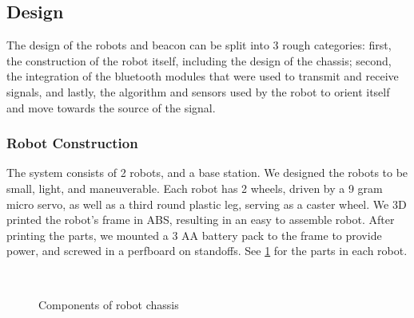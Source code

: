 \documentclass[]{article}
\begin{document}
\subsection{Design}

The design of the robots and beacon can be split into 3 rough categories: first, the construction of the robot itself, including the design of the chassis; second, the integration of the bluetooth modules that were used to transmit and receive signals, and lastly, the algorithm and sensors used by the robot to orient itself and move towards the source of the signal.

\subsubsection{Robot Construction}

The system consists of 2 robots, and a base station.
We designed the robots to be small, light, and maneuverable.
Each robot has 2 wheels, driven by a 9 gram micro servo, as well as a third round plastic leg, serving as a caster wheel.
We 3D printed the robot's frame in ABS, resulting in an easy to assemble robot.
After printing the parts, we mounted a 3 AA battery pack to the frame to provide power,
and screwed in a perfboard on standoffs. See \ref{fig:robotchassis} for the parts in each robot.

\begin{figure}
  \centering
  \\
  \caption{Components of robot chassis}
  \label{fig:robotchassis}
\end{figure}
\end{document}
